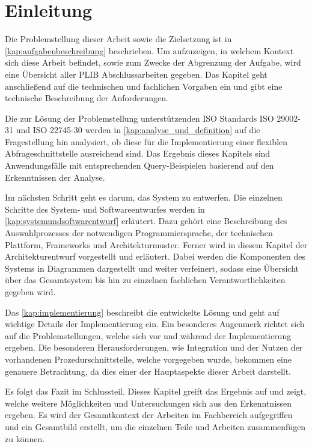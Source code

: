 
\chapter{Einleitung}\label{sec:einleitung}

Die Problemstellung dieser Arbeit sowie die Zielsetzung ist in \autoref{kap:aufgabenbeschreibung} beschrieben. Um aufzuzeigen, in welchem Kontext sich diese Arbeit befindet, sowie zum Zwecke der Abgrenzung der Aufgabe, wird eine Übersicht aller PLIB Abschlussarbeiten gegeben. Das Kapitel geht anschließend auf die technischen und fachlichen Vorgaben ein und gibt eine technische Beschreibung der Anforderungen.

Die zur Lösung der Problemstellung unterstützenden ISO Standards ISO 29002-31 und ISO 22745-30 werden in \autoref{kap:analyse_und_definition} auf die Fragestellung hin analysiert, ob diese für die Implementierung einer flexiblen \gls{Abfrageschnittstelle} ausreichend sind. Das Ergebnis dieses Kapitels sind Anwendungsfälle mit entsprechenden Query-Beispielen basierend auf den Erkenntnissen der Analyse.  

Im nächsten Schritt geht es darum, das System zu entwerfen. Die einzelnen Schritte des System- und Softwareentwurfes werden in \autoref{kap:systemundsoftwarentwurf} erläutert. Dazu gehört eine Beschreibung des Auswahlprozesses der notwendigen Programmiersprache, der technischen Plattform, Frameworks und Architekturmuster. 
Ferner wird in diesem Kapitel der Architekturentwurf vorgestellt und erläutert. Dabei werden die Komponenten des Systems in Diagrammen dargestellt und weiter verfeinert, sodass eine Übersicht über das Gesamtsystem bis hin zu einzelnen fachlichen Verantwortlichkeiten gegeben wird. 

Das \autoref{kap:implementierung} beschreibt die entwickelte Lösung und geht auf wichtige Details der Implementierung ein. Ein besonderes Augenmerk richtet sich auf die Problemstellungen, welche sich vor und während der Implementierung ergeben. Die besonderen Herausforderungen, wie Integration und der Nutzen der vorhandenen Prozedurschnittstelle, welche vorgegeben wurde, bekommen eine genauere Betrachtung, da dies einer der Hauptaspekte dieser Arbeit darstellt.

Es folgt das Fazit im Schlussteil. Dieses Kapitel greift das Ergebnis auf und zeigt, welche weitere Möglichkeiten und Untersuchungen sich aus den Erkenntnissen ergeben. Es wird der Gesamtkontext der Arbeiten im Fachbereich aufgegriffen und ein Gesamtbild erstellt, um die einzelnen Teile und Arbeiten zusammenfügen zu können. 